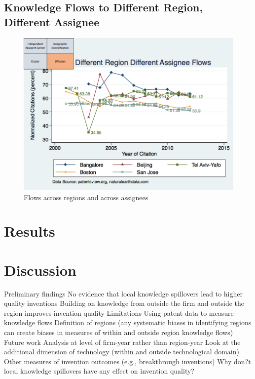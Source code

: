 \documentclass[12pt]{article}
\begin{document}
\subsection{Knowledge Flows to Different Region, Different Assignee}
\begin{figure}[h]
\begin{centering}
  \includegraphics[width=\textwidth]{SMSDiffRegionDiffAssigneeFlows}
  \caption{Flows across regions and across assignees}
  \label{fig:SMSDiffRegionDiffAssigneeFlows}
\end{centering}
\end{figure}

\section{Results}
\begin{landscape}
\begin{centering}

\end{centering}
\end{landscape}

\section{Discussion}
Preliminary findings
No evidence that local knowledge spillovers lead to higher quality inventions
Building on knowledge from outside the firm and outside the region improves invention quality
Limitations
Using patent data to measure knowledge flows
Definition of regions (any systematic biases in identifying regions can create biases in measures of within and outside region knowledge flows)
Future work
Analysis at level of firm-year rather than region-year
Look at the additional dimension of technology (within and outside technological domain)
Other measures of invention outcomes (e.g., breakthrough inventions)
Why don?t local knowledge spillovers have any effect on invention quality? 
\end{document}
